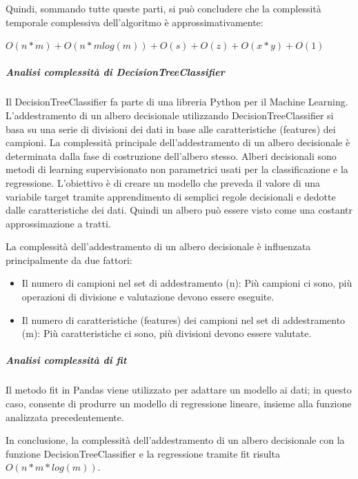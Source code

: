 Quindi, sommando tutte queste parti, si può concludere che la complessità temporale complessiva dell'algoritmo 
è approssimativamente:

\boldmath
\begin{center}
    $O(n * m) + O(n * m log(m)) + O(s) + O(z) + O(x * y) + O(1)$
\end{center}
\unboldmath


\subparagraph{Analisi complessità di \textit{DecisionTreeClassifier}}
Il DecisionTreeClassifier fa parte di una libreria Python per il Machine Learning.
L'addestramento di un albero decisionale utilizzando DecisionTreeClassifier si basa 
su una serie di divisioni dei dati in base alle caratteristiche (features) dei campioni.
La complessità principale dell'addestramento di un albero decisionale è determinata 
dalla fase di costruzione dell'albero stesso.
Alberi decisionali sono metodi di learning supervisionato non parametrici usati per la classificazione
e la regressione. L'obiettivo è di creare un modello che preveda il valore di una variabile target tramite 
apprendimento di semplici regole decisionali e dedotte dalle caratteristiche dei dati. Quindi 
un albero può essere visto come una costantr approssimazione a tratti.


La complessità dell'addestramento di un albero decisionale è influenzata 
principalmente da due fattori:
\begin{itemize}
    \item Il numero di campioni nel set di addestramento (n): Più campioni ci sono, 
        più operazioni di divisione e valutazione devono essere eseguite.
    \item Il numero di caratteristiche (features) dei campioni nel set di addestramento (m): 
        Più caratteristiche ci sono, più divisioni devono essere valutate.
\end{itemize}

\vspace{0.3cm}
\subparagraph{Analisi complessità di \textit{fit}}
Il metodo fit in Pandas viene utilizzato per adattare un modello ai dati; in questo caso,
consente di produrre un modello di regressione lineare, insieme alla funzione analizzata
precedentemente. 
\vspace{0.5cm}


In conclusione, la complessità dell'addestramento di un albero decisionale 
con la funzione DecisionTreeClassifier e la regressione tramite fit 
risulta $O(n * m * log(m))$.






